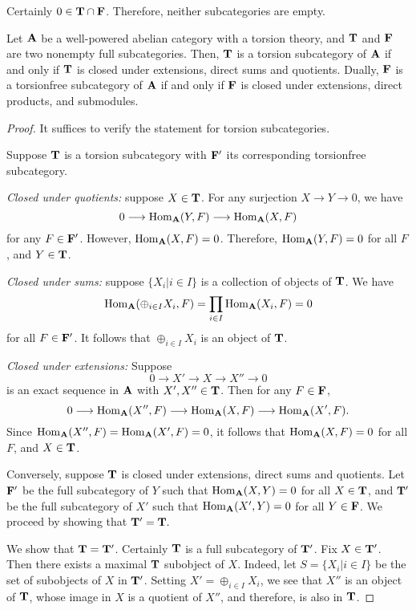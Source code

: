 Certainly $0 \in \mathbf{T} \cap \mathbf{F}$. Therefore, neither 
subcategories are empty.

\begin{prop}
Let $\mathbf{A}$ be a well-powered abelian category with a torsion 
theory, and $\mathbf{T}$ and $\mathbf{F}$ are two nonempty full 
subcategories. Then, $\mathbf{T}$ is a torsion subcategory of 
$\mathbf{A}$ if and only if $\mathbf{T}$ is closed under extensions, 
direct sums and quotients. Dually, $\mathbf{F}$ is a torsionfree 
subcategory of $\mathbf{A}$ if and only if $\mathbf{F}$ is closed under 
extensions, direct products, and submodules.
\end{prop}

\begin{proof}
It suffices to verify the statement for torsion subcategories.

Suppose $\mathbf{T}$ is a torsion subcategory with $\mathbf{F}'$ its 
corresponding torsionfree subcategory. 

\emph{Closed under quotients:} suppose $X \in \mathbf{T}$. For any 
surjection $X \to Y \to 0$, we have 
\[
0 \longrightarrow \mathrm{Hom}_{\mathbf{A}}(Y, F) \longrightarrow \mathrm{Hom}_{\mathbf{A}}(X, F)
\]
for any $F \in \mathbf{F}'$. However, $\mathrm{Hom}_{\mathbf{A}}(X, F) = 0$.
Therefore, $\mathrm{Hom}_{\mathbf{A}}(Y, F) = 0$ for all $F$, and $Y \in
\mathbf{T}$.

\emph{Closed under sums:} suppose $\{X_i| i \in I\}$ is a 
collection of objects of $\mathbf{T}$. We have
\[
\mathrm{Hom}_{\mathbf{A}}( \oplus_{i \in I} X_i, F) = \prod_{i \in I}
\mathrm{Hom}_{\mathbf{A}}( X_i, F) = 0
\]
for all $F \in \mathbf{F}'$. It follows that $\oplus_{i \in I} X_i$
is an object of $\mathbf{T}$.

\emph{Closed under extensions:} Suppose 
\[
0 \to X' \to X \to X'' \to 0
\]
is an exact sequence in $\mathbf{A}$ with $X', X'' \in \mathbf{T}$.
Then for any $F \in \mathbf{F}$, 
\[
0 \longrightarrow \mathrm{Hom}_{\mathbf{A}}(X'', F) \longrightarrow \mathrm{Hom}_{\mathbf{A}}(X, F) \longrightarrow
\mathrm{Hom}_{\mathbf{A}}(X', F).
\]
Since $\mathrm{Hom}_{\mathbf{A}}(X'', F) = \mathrm{Hom}_{\mathbf{A}}(X', F) = 0$,
it follows that $\mathrm{Hom}_{\mathbf{A}}(X, F) = 0$ for all $F$, and
$X \in \mathbf{T}$.

Conversely, suppose $\mathbf{T}$ is closed under extensions, direct 
sums and quotients. Let $\mathbf{F}'$ be the full subcategory of $Y$ 
such that $\mathrm{Hom}_{\mathbf{A}}(X, Y) = 0$ for all $X \in \mathbf{T}$, and 
$\mathbf{T}'$ be the full subcategory of $X'$ such that 
$\mathrm{Hom}_{\mathbf{A}}(X', Y) = 0$ for all $Y \in \mathbf{F}$. We proceed
by showing that $\mathbf{T'} = \mathbf{T}.$

We show that $\mathbf{T} = \mathbf{T'}$. Certainly $\mathbf{T}$ is a full
subcategory of $\mathbf{T'}$. Fix $X \in \mathbf{T'}$. Then there exists
a maximal $\mathbf{T}$ subobject of $X$. Indeed, let $S = \{X_i| i 
\in I\}$ be the set of subobjects of $X$ in $\mathbf{T'}$. Setting 
$X' = \displaystyle \oplus_{i \in I} X_i$, we see that $X''$ is 
an object of $\mathbf{T}$, whose image in $X$ is a quotient of 
$X''$, and therefore, is also in $\mathbf{T}$. 


\end{proof}
